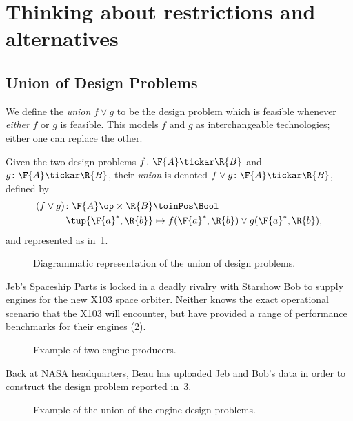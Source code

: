 \section{Thinking about restrictions and alternatives}
\subsection{Union of Design Problems}

We define the \emph{union} $f \vee g$ to be the design problem which is feasible whenever \emph{either} $f$ or $g$ is feasible. This models $f$ and $g$ as interchangeable technologies; either one can replace the other.

\begin{definition}
Given the two design problems $f \colon \F{A} \tickar \R{B}$ and $g \colon \F{A} \tickar \R{B}$, their \emph{union} is denoted $f \vee g \colon \F{A} \tickar \R{B}$, defined by
\begin{equation}
\begin{aligned}
(f \vee g)\colon \F{A}\op \times \R{B} & \toinPos \Bool \\
\tup{\F{a}^*, \R{b}} & \mapsto f(\F{a}^*, \R{b}) \vee g(\F{a}^*, \R{b}),
\end{aligned}
\end{equation}
and represented as in~\cref{fig:uniondp}.
\begin{figure}[h!]
\begin{center}
\end{center}
\caption{Diagrammatic representation of the union of design problems. \label{fig:uniondp}}
\end{figure}
\end{definition}

\begin{example}
Jeb's Spaceship Parts is locked in a deadly rivalry with Starshow Bob to supply engines for the new X103 space orbiter. Neither knows the exact operational scenario that the X103 will encounter, but have provided a range of performance benchmarks for their engines (\cref{fig:exunion_1}).
\begin{figure}[h!]
\begin{center}
\end{center}
\caption{Example of two engine producers. \label{fig:exunion_1}}
\end{figure}
Back at NASA headquarters, Beau has uploaded Jeb and Bob's data in order to construct the design problem reported in~\cref{fig:exunion_2}.
\begin{figure}[h!]
\begin{center}
\end{center}
\caption{Example of the union of the engine design problems. \label{fig:exunion_2}}
\end{figure}
\end{example}


